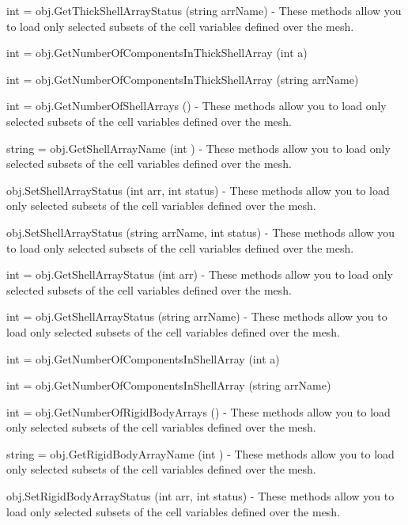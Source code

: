 \begin{DoxyItemize}
\item {\ttfamily int = obj.\-Get\-Thick\-Shell\-Array\-Status (string arr\-Name)} -\/ These methods allow you to load only selected subsets of the cell variables defined over the mesh.  
\item {\ttfamily int = obj.\-Get\-Number\-Of\-Components\-In\-Thick\-Shell\-Array (int a)}  
\item {\ttfamily int = obj.\-Get\-Number\-Of\-Components\-In\-Thick\-Shell\-Array (string arr\-Name)}  
\item {\ttfamily int = obj.\-Get\-Number\-Of\-Shell\-Arrays ()} -\/ These methods allow you to load only selected subsets of the cell variables defined over the mesh.  
\item {\ttfamily string = obj.\-Get\-Shell\-Array\-Name (int )} -\/ These methods allow you to load only selected subsets of the cell variables defined over the mesh.  
\item {\ttfamily obj.\-Set\-Shell\-Array\-Status (int arr, int status)} -\/ These methods allow you to load only selected subsets of the cell variables defined over the mesh.  
\item {\ttfamily obj.\-Set\-Shell\-Array\-Status (string arr\-Name, int status)} -\/ These methods allow you to load only selected subsets of the cell variables defined over the mesh.  
\item {\ttfamily int = obj.\-Get\-Shell\-Array\-Status (int arr)} -\/ These methods allow you to load only selected subsets of the cell variables defined over the mesh.  
\item {\ttfamily int = obj.\-Get\-Shell\-Array\-Status (string arr\-Name)} -\/ These methods allow you to load only selected subsets of the cell variables defined over the mesh.  
\item {\ttfamily int = obj.\-Get\-Number\-Of\-Components\-In\-Shell\-Array (int a)}  
\item {\ttfamily int = obj.\-Get\-Number\-Of\-Components\-In\-Shell\-Array (string arr\-Name)}  
\item {\ttfamily int = obj.\-Get\-Number\-Of\-Rigid\-Body\-Arrays ()} -\/ These methods allow you to load only selected subsets of the cell variables defined over the mesh.  
\item {\ttfamily string = obj.\-Get\-Rigid\-Body\-Array\-Name (int )} -\/ These methods allow you to load only selected subsets of the cell variables defined over the mesh.  
\item {\ttfamily obj.\-Set\-Rigid\-Body\-Array\-Status (int arr, int status)} -\/ These methods allow you to load only selected subsets of the cell variables defined over the mesh.  

\end{DoxyItemize}

